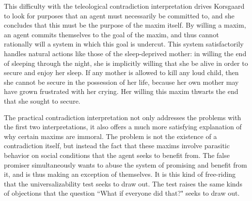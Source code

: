\begin{isabellebody}
\begin{isamarkuptext}
This difficulty with the teleological contradiction interpretation drives Korsgaard to look for purposes
that an agent must necessarily be committed to, and she concludes that this must be the purpose of the 
maxim itself. By willing a maxim, an agent commits themselves to the goal of the maxim, and thus cannot 
rationally will a system in which this goal is undercut. This system satisfactorily handles natural actions
like those of the sleep-deprived mother: in willing the end of sleeping through the night, she is 
implicitly willing that she be alive in order to secure and enjoy her sleep. If any mother is allowed to kill
any loud child, then she cannot be secure in the possession of her life, because her own mother may have 
grown frustrated with her crying. Her willing this maxim thwarts the end that she sought to secure. 

The practical contradiction interpretation not only addresses the problems with the first two 
interpretations, it also offers a much more satisfying explanation of why certain maxims are immoral. 
The problem is not the existence of a contradiction itself, but instead the fact that these maxims 
involve parasitic behavior on social conditions that the agent seeks to benefit from. The false promiser 
simultaneously wants to abuse the system of promising and benefit from it, and is thus making an exception 
of themselves. It is this kind of free-riding that the universalizability test seeks to draw out. The test
raises the same kinds of objections that the question ``What if everyone did that?" seeks to draw out.%
\end{isamarkuptext}\isamarkuptrue%
%
\isadelimtheory
%
\endisadelimtheory
%
\isatagtheory
%
\endisatagtheory
{\isafoldtheory}%
%
\isadelimtheory
%
\endisadelimtheory
%
\end{isabellebody}%
\endinput

